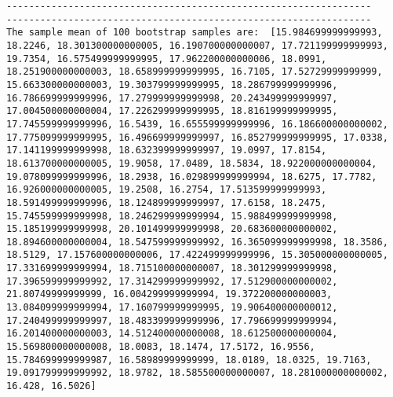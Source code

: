 \documentclass[11pt]{article}
\begin{document}
\begin{Verbatim}[commandchars=\\\{\}]
-----------------------------------------------------------------
-----------------------------------------------------------------
The sample mean of 100 bootstrap samples are:  [15.984699999999993, 18.2246, 18.301300000000005, 16.190700000000007, 17.721199999999993, 19.7354, 16.575499999999995, 17.962200000000006, 18.0991, 18.251900000000003, 18.658999999999995, 16.7105, 17.52729999999999, 15.663300000000003, 19.303799999999995, 18.286799999999996, 16.786699999999996, 17.279999999999998, 20.243499999999997, 17.004500000000004, 17.226299999999995, 18.816199999999995, 17.745599999999996, 16.5439, 16.655599999999996, 16.186600000000002, 17.775099999999995, 16.496699999999997, 16.852799999999995, 17.0338, 17.141199999999998, 18.632399999999997, 19.0997, 17.8154, 18.613700000000005, 19.9058, 17.0489, 18.5834, 18.922000000000004, 19.078099999999996, 18.2938, 16.029899999999994, 18.6275, 17.7782, 16.926000000000005, 19.2508, 16.2754, 17.513599999999993, 18.591499999999996, 18.124899999999997, 17.6158, 18.2475, 15.745599999999998, 18.246299999999994, 15.988499999999998, 15.185199999999998, 20.101499999999998, 20.683600000000002, 18.894600000000004, 18.547599999999992, 16.365099999999998, 18.3586, 18.5129, 17.157600000000006, 17.422499999999996, 15.305000000000005, 17.331699999999994, 18.715100000000007, 18.301299999999998, 17.396599999999992, 17.314299999999992, 17.512900000000002, 21.80749999999999, 16.004299999999994, 19.372200000000003, 13.084099999999994, 17.160799999999995, 19.906400000000012, 17.240499999999997, 18.483399999999996, 17.796699999999994, 16.201400000000003, 14.512400000000008, 18.612500000000004, 15.569800000000008, 18.0083, 18.1474, 17.5172, 16.9556, 15.784699999999987, 16.58989999999999, 18.0189, 18.0325, 19.7163, 19.091799999999992, 18.9782, 18.585500000000007, 18.281000000000002, 16.428, 16.5026]



\end{Verbatim}
\end{document}
